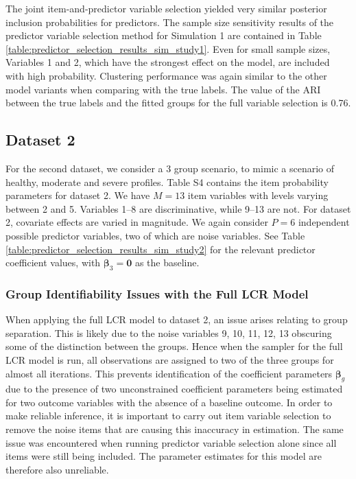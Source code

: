 \documentclass[11pt]{article}
\def\bsbet{\boldsymbol{\beta}}
\theoremstyle{plain}
\theoremstyle{definition}
\begin{document}
The joint item-and-predictor variable selection yielded very similar posterior inclusion probabilities for predictors. The sample size sensitivity results of the predictor variable selection method for Simulation 1 are contained in Table \ref{table:predictor_selection_results_sim_study1}. Even for small sample sizes, Variables 1 and 2, which have the strongest effect on the model, are included with high probability.
Clustering performance was again similar to the other model variants when comparing with the true labels. The value of the ARI between the true labels and the fitted groups for the full variable selection is 0.76.
\subsection{Dataset 2}\label{subsec:sim_study2}
For the second dataset, we consider a 3 group scenario, to mimic a scenario of healthy, moderate and severe profiles. Table S4 contains the item probability parameters for dataset 2. We have $M = 13$ item variables with levels varying between 2 and 5. Variables 1--8 are discriminative, while 9--13 are not.
For dataset 2, covariate effects are varied in magnitude. We again consider $P = 6$ independent possible predictor variables, two of which are noise variables. See Table \ref{table:predictor_selection_results_sim_study2} for the relevant predictor coefficient values, with $\bsbet_3 = \mathbf{0}$ as the baseline.
\subsubsection{Group Identifiability Issues with the Full LCR Model}
When applying the full LCR model to dataset 2, an issue arises relating to group separation. This is likely due to the noise variables 9, 10, 11, 12, 13 obscuring some of the distinction between the groups. Hence when the sampler for the full LCR model is run, all observations are assigned to two of the three groups for almost all iterations. This prevents identification of the coefficient parameters $\bsbet_g$ due to the presence of two unconstrained coefficient parameters being estimated for two outcome variables with the absence of a baseline outcome. In order to make reliable inference, it is important to carry out item variable selection to remove the noise items that are causing this inaccuracy in estimation. The same issue was encountered when running predictor variable selection alone since all items were still being included. The parameter estimates for this model are therefore also unreliable. 
\end{document}

